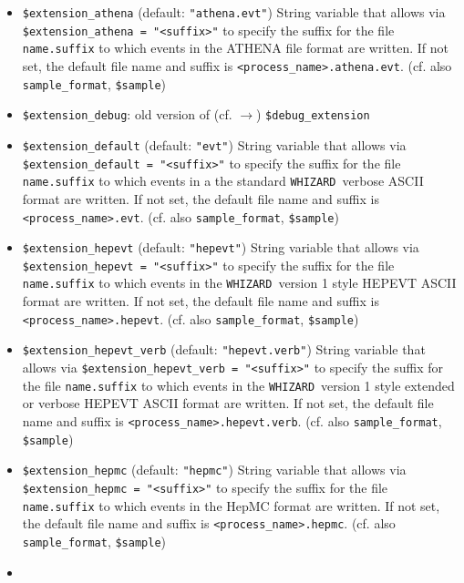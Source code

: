\documentclass[12pt]{book}
\newcommand{\ttt}[1]{\texttt{#1}}
\newcommand{\whizard}{\texttt{WHIZARD}}
\begin{document}
\begin{itemize}
\item
\ttt{\$extension\_athena} \qquad (default: \ttt{"athena.evt"}) \newline
String variable that allows via \ttt{\$extension\_athena =
  "<suffix>"} to specify the suffix for the file \ttt{name.suffix} to
which events in the ATHENA file format are written. If not set, the
default file name and suffix is
\ttt{<process\_name>.athena.evt}. (cf. also \ttt{sample\_format},
\ttt{\$sample}) 
\item
\ttt{\$extension\_debug}: old version of (cf. $\to$)
\ttt{\$debug\_extension}
\item
\ttt{\$extension\_default} \qquad (default: \ttt{"evt"}) \newline
String variable that allows via \ttt{\$extension\_default = "<suffix>"} to 
specify the suffix for the file \ttt{name.suffix} to which events in a
the standard \whizard\ verbose ASCII format are written. If not
set, the default file name and suffix is \ttt{<process\_name>.evt}. (cf. also
\ttt{sample\_format}, \ttt{\$sample}) 
\item
\ttt{\$extension\_hepevt} \qquad (default: \ttt{"hepevt"}) \newline
String variable that allows via \ttt{\$extension\_hepevt = "<suffix>"} to 
specify the suffix for the file \ttt{name.suffix} to which events in
the \whizard\ version 1 style HEPEVT ASCII format are written. If not set, the
default file name and suffix is
\ttt{<process\_name>.hepevt}. (cf. also \ttt{sample\_format},
\ttt{\$sample})
\item
\ttt{\$extension\_hepevt\_verb} \qquad (default: \ttt{"hepevt.verb"}) \newline
String variable that allows via \ttt{\$extension\_hepevt\_verb = "<suffix>"} to
specify the suffix for the file \ttt{name.suffix} to which events in
the \whizard\ version 1 style extended or verbose HEPEVT ASCII format
are written. If not set, the default file name and suffix is
\ttt{<process\_name>.hepevt.verb}. (cf. also \ttt{sample\_format},
\ttt{\$sample})   
\item
\ttt{\$extension\_hepmc} \qquad (default: \ttt{"hepmc"}) \newline
String variable that allows via \ttt{\$extension\_hepmc = "<suffix>"} to 
specify the suffix for the file \ttt{name.suffix} to which events in
the HepMC format are written. If not set, the default file name and suffix is
\ttt{<process\_name>.hepmc}. (cf. also \ttt{sample\_format},
\ttt{\$sample})  
\item

\end{itemize}
\end{document}

